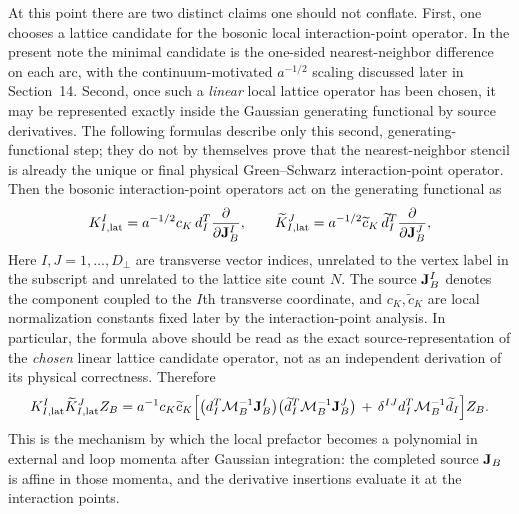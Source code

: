 \documentclass[11pt]{article}
\numberwithin{equation}{section}
\newcommand{\perpD}{D_\perp}
\begin{document}
At this point there are two distinct claims one should not conflate. First, one chooses a lattice candidate for the bosonic local interaction-point operator. In the present note the minimal candidate is the one-sided nearest-neighbor difference on each arc, with the continuum-motivated $a^{-1/2}$ scaling discussed later in Section~14. Second, once such a \emph{linear} local lattice operator has been chosen, it may be represented exactly inside the Gaussian generating functional by source derivatives. The following formulas describe only this second, generating-functional step; they do not by themselves prove that the nearest-neighbor stencil is already the unique or final physical Green--Schwarz interaction-point operator.
Then the bosonic interaction-point operators act on the generating functional as
\begin{equation}
\label{eq:s8-011}
K_{I,\mathrm{lat}}^I
=
a^{-1/2}c_K\,d_I^T\frac{\partial}{\partial {\bf J}_B^I},
\qquad
\widetilde K_{I,\mathrm{lat}}^J
=
a^{-1/2}\widetilde c_K\,\widetilde d_I^T\frac{\partial}{\partial {\bf J}_B^J},
\end{equation}
Here $I,J=1,\dots,\perpD$ are transverse vector indices, unrelated to the vertex label in the subscript and unrelated to the lattice site count $N$. The source ${\bf J}_B^I$ denotes the component coupled to the $I$th transverse coordinate, and $c_K,\widetilde c_K$ are local normalization constants fixed later by the interaction-point analysis. In particular, the formula above should be read as the exact source-representation of the \emph{chosen} linear lattice candidate operator, not as an independent derivation of its physical correctness.
Therefore
\begin{equation}
\label{eq:s8-012}
\begin{aligned}
K_{I,\mathrm{lat}}^I \widetilde K_{I,\mathrm{lat}}^J Z_B
=
a^{-1}c_K\widetilde c_K
\Big[
\bigl(d_I^T{\cal M}_B^{-1}{\bf J}_B^I\bigr)
\bigl(\widetilde d_I^T{\cal M}_B^{-1}{\bf J}_B^J\bigr)
\,+\,
\delta^{IJ} d_I^T{\cal M}_B^{-1}\widetilde d_I
\Big]Z_B.
\end{aligned}
\end{equation}
This is the mechanism by which the local prefactor becomes a polynomial in external and loop momenta after Gaussian integration: the completed source ${\bf J}_B$ is affine in those momenta, and the derivative insertions evaluate it at the interaction points.
\end{document}
